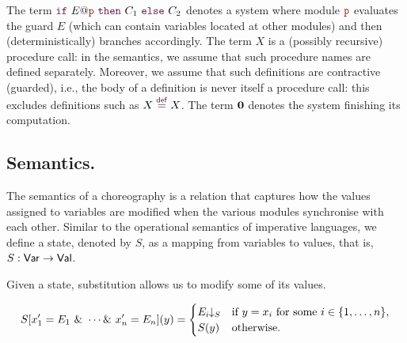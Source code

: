 The term $\ifTE {E}{\nr}{C_1}{C_2}$ denotes a system where module
  $\role p$ evaluates the guard $E$ (which can contain variables
  located at other modules) and then (deterministically) branches
  accordingly.  The term $X$ is a (possibly recursive) procedure call:
  in the semantics, we assume that such procedure names are defined
  separately. Moreover, we assume that such definitions are
  contractive (guarded), i.e., the body of a definition is never
  itself a procedure call: this excludes definitions such as
  $X\stackrel{\textcolor{sh_keyword}{\mathsf{def}}}{=}X$. The term
  $\mathbf{0}$ denotes the system finishing its computation.

  \begin{asm}\label{ass:0}
  \end{asm}
  
\subsection{Semantics.}
The semantics of a choreography is a relation that captures how the
values assigned to variables are modified when the various modules
synchronise with each other. Similar to the operational semantics of
imperative languages, we define a state, denoted by $S$, as a mapping
from variables to values, that is, $S : \mathsf{Var} \rightarrow \mathsf{Val}$.

Given a state, substitution allows us to modify some of its values.

%
\begin{defi}
  \[
    S[x_1' = E_1\ \&\ \cdots \&\ x_n' = E_n](y) =
    \begin{cases}
      \eval{E_i}{S} & \text{if } y = x_i \text{ for some } i \in \{1, \ldots, n\},\\
      S(y)          & \text{otherwise.}
    \end{cases}
  \]
\end{defi}

